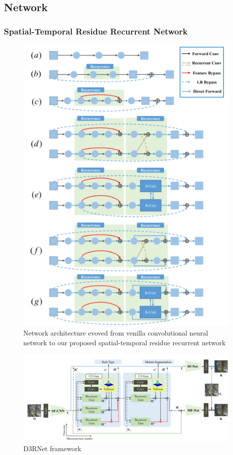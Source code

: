 \documentclass{article}
\begin{document}
\subsection{Network}
\subsubsection{Spatial-Temporal Residue Recurrent Network}
\begin{figure}[H]
\centering
\includegraphics[width=\linewidth]{D3RNET.PNG}
\caption{Network architecture evoved from venilla convolutional neural network to our proposed spatial-temporal residue recurrent network}
\end{figure}

\begin{figure}[H]
\centering
\includegraphics[width=\linewidth]{D3RNET2.PNG}
\caption{D3RNet framework}
\end{figure}
\end{document}
